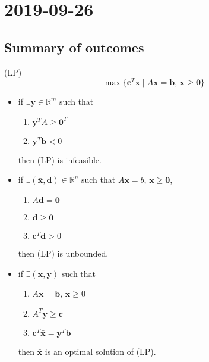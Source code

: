 \section{2019-09-26}
\subsection{Summary of outcomes}
(LP)
\[\max \{\mathbf{c}^T\mathbf{x} \mid A\mathbf{x}=\mathbf{b}\text{, }
\mathbf{x}\ge\mathbf{0}\}\]
\begin{itemize}
    \item if $\exists \mathbf{y}\in\mathbb{R}^m$ such that
    \begin{enumerate}
        \item $\mathbf{y}^TA\ge\mathbf{0}^T$
        \item $\mathbf{y}^T\mathbf{b}<0$
    \end{enumerate}
    then (LP) is infeasible.
    \item if $\exists(\bar{\mathbf{x}}, \mathbf{d})\in\mathbb{R}^n$ such that $A\mathbf{x}=b$, $\mathbf{x}\ge \mathbf{0}$, 
    \begin{enumerate}
        \item $A\mathbf{d}=\mathbf{0}$
        \item $\mathbf{d}\ge \mathbf{0}$
        \item $\mathbf{c}^T\mathbf{d}>0$
    \end{enumerate}
    then (LP) is unbounded.
    \item if $\exists(\mathbf{\bar{x}},\mathbf{y})$ such that
    \begin{enumerate}
        \item $A\mathbf{\bar{x}}=\mathbf{b}$, $\mathbf{x}\ge 0$
        \item $A^T\mathbf{y}\ge\mathbf{c}$
        \item $\mathbf{c}^T \mathbf{\bar{x}}=\mathbf{y}^T\mathbf{b}$
    \end{enumerate}
    then $\mathbf{\bar{x}}$ is an optimal solution of (LP).
\end{itemize}

